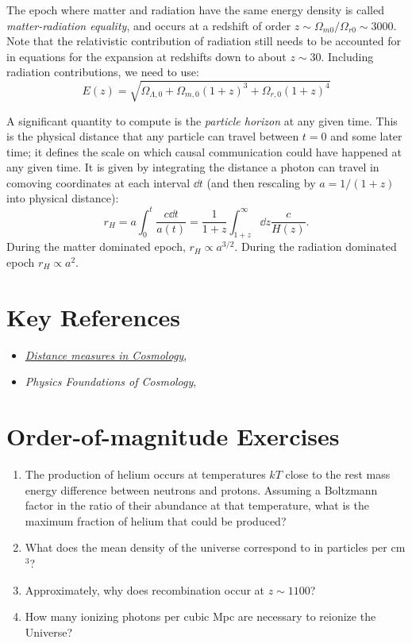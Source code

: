 The epoch where matter and radiation have the same energy density is
called {\it matter-radiation equality}, and occurs at a redshift of
order $z \sim \Omega_{m0}/\Omega_{r0} \sim 3000$. Note that the
relativistic contribution of radiation still needs to be accounted for
in equations for the expansion at redshifts down to about $z\sim
30$. Including radiation contributions, we need to use:
\begin{equation}
\label{eq:fullE}
E(z) = \sqrt{\Omega_{\Lambda,0} + \Omega_{m,0} (1+z)^3 + \Omega_{r,0}
(1+z)^4}
\end{equation}

A significant quantity to compute is the {\it particle horizon} at any
given time. This is the physical distance that any particle can travel
between $t=0$ and some later time; it defines the scale on which
causal communication could have happened at any given time. It is
given by integrating the distance a photon can travel in comoving
coordinates at each interval $\dd t$ (and then rescaling by
$a=1/(1+z)$ into physical distance):
\begin{equation}
r_H = a \int_0^t \frac{c \dd t}{a(t)}
= \frac{1}{1+z} \int_{1+z}^\infty {\dd z} \frac{c}{H(z)}.
\end{equation}
During the matter dominated epoch, $r_H\propto a^{3/2}$. During the
radiation dominated epoch $r_H\propto a^2$.

\section{Key References}

\begin{itemize}
  \item
    \href{http://adsabs.harvard.edu/abs/1999astro.ph..5116H}{
    {\it Distance measures in Cosmology},
      \citet{hogg99cosm}}
  \item
    {\it Physics Foundations of Cosmology},
    \citet{mukhanov05a}
\end{itemize}

\section{Order-of-magnitude Exercises}

\begin{enumerate} 
\item The production of helium occurs at temperatures $kT$ close to
    the rest mass energy difference between neutrons and
    protons. Assuming a Boltzmann factor in the ratio of their
    abundance at that temperature, what is the maximum fraction of
    helium that could be produced? 
\item What does the mean density of the universe correspond to in
    particles per cm$^3$?
\item Approximately, why does recombination occur at $z\sim 1100$?
\item How many ionizing photons per cubic Mpc are necessary to
reionize the Universe?
\end{enumerate} 

